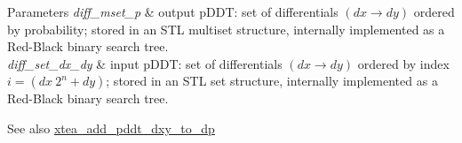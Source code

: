 \begin{DoxyParams}{\-Parameters}
{\em diff\-\_\-mset\-\_\-p} & output p\-D\-D\-T\-: set of differentials $(dx \rightarrow dy)$ ordered by probability; stored in an \-S\-T\-L multiset structure, internally implemented as a \-Red-\/\-Black binary search tree. \\
\hline
{\em diff\-\_\-set\-\_\-dx\-\_\-dy} & input p\-D\-D\-T\-: set of differentials $(dx \rightarrow dy)$ ordered by index $i = (dx~ 2^{n} + dy)$; stored in an \-S\-T\-L set structure, internally implemented as a \-Red-\/\-Black binary search tree.\\
\hline
\end{DoxyParams}
\begin{DoxySeeAlso}{\-See also}
\hyperlink{xtea-f-add-pddt_8hh_a84e14ae4c2be82a4895dfa91f012e9e3}{xtea\-\_\-add\-\_\-pddt\-\_\-dxy\-\_\-to\-\_\-dp} 
\end{DoxySeeAlso}
